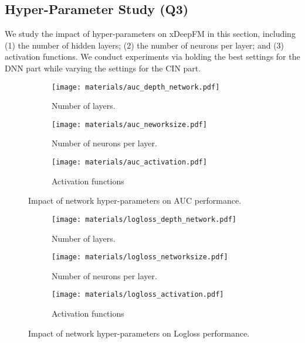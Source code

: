  \subsection{Hyper-Parameter Study (Q3)}
 We study the impact of hyper-parameters on xDeepFM in this section, including (1) the number of hidden layers; (2) the number of neurons per layer; and (3) activation functions. We conduct experiments via holding the best settings for the DNN part while varying the settings for the CIN part.
 \begin{figure*}[htbp]
\centering
\begin{subfigure}{.32\textwidth}
  \centering
  \texttt{[image: materials/auc\_depth\_network.pdf]}
  \caption{Number of layers.}
  \label{fig:auc_depth}
\end{subfigure} \hfill  
\begin{subfigure}{.32\textwidth}
  \centering
  \texttt{[image: materials/auc\_neworksize.pdf]}
  \caption{Number of neurons per layer.}
  \label{fig:auc_size}
\end{subfigure}    \hfill  
\begin{subfigure}{.32\textwidth}
  \centering
  \texttt{[image: materials/auc\_activation.pdf]}
  \caption{Activation functions}
  \label{fig:auc_activation}
\end{subfigure} 
\caption{Impact of network hyper-parameters on AUC performance.}
\label{fig:auc_hyperparameter}
\end{figure*}
 \begin{figure*}[htbp]
\centering
\begin{subfigure}{.32\textwidth}
  \centering
  \texttt{[image: materials/logloss\_depth\_network.pdf]}
  \caption{Number of layers.}
  \label{fig:logloss_depth}
\end{subfigure} \hfill  
\begin{subfigure}{.32\textwidth}
  \centering
  \texttt{[image: materials/logloss\_networksize.pdf]}
  \caption{Number of neurons per layer.}
  \label{fig:logloss_size}
\end{subfigure}    \hfill  
\begin{subfigure}{.32\textwidth}
  \centering
  \texttt{[image: materials/logloss\_activation.pdf]}
  \caption{Activation functions}
  \label{fig:logloss_activation}
\end{subfigure} 
\caption{Impact of network hyper-parameters on Logloss performance.}
\label{fig:logloss_hyperparameter}
\end{figure*}  
